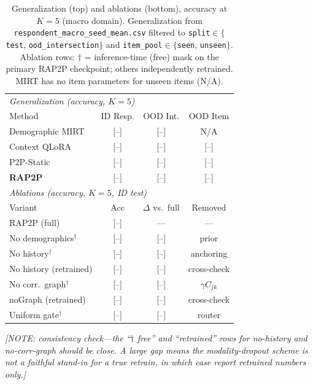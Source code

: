 \documentclass[letterpaper]{article} %
\begin{document}
\begin{table}[t]
\centering
\caption{Generalization (top) and ablations (bottom), accuracy at $K{=}5$
(macro domain). Generalization from \texttt{respondent\_macro\_seed\_mean.csv}
filtered to \texttt{split}$\in\{$\texttt{test}, \texttt{ood\_intersection}$\}$
and \texttt{item\_pool}$\in\{$\texttt{seen}, \texttt{unseen}$\}$. Ablation rows:
$\dagger$ = inference-time (free) mask on the primary RAP2P checkpoint; others
independently retrained. MIRT has no item parameters for unseen items (N/A).}
\label{tab:gen}
\setlength{\tabcolsep}{4pt}
\begin{tabular}{lccc}
\toprule
\multicolumn{4}{l}{\emph{Generalization (accuracy, $K{=}5$)}}\\
Method & ID Resp. & OOD Int. & OOD Item \\
\midrule
Demographic MIRT & [--] & [--] & N/A \\
Context QLoRA    & [--] & [--] & [--] \\
P2P-Static       & [--] & [--] & [--] \\
\textbf{RAP2P}   & [--] & [--] & [--] \\
\midrule
\multicolumn{4}{l}{\emph{Ablations (accuracy, $K{=}5$, ID test)}}\\
Variant & Acc & $\Delta$ vs.\ full & Removed \\
\midrule
RAP2P (full)             & [--] & ---  & --- \\
No demographics$^{\dagger}$ & [--] & [--] & prior \\
No history$^{\dagger}$      & [--] & [--] & anchoring \\
No history (retrained)   & [--] & [--] & cross-check \\
No corr.\ graph$^{\dagger}$ & [--] & [--] & $\gamma C_{jk}$ \\
noGraph (retrained)      & [--] & [--] & cross-check \\
Uniform gate$^{\dagger}$    & [--] & [--] & router \\
\bottomrule
\end{tabular}
\end{table}

\emph{[NOTE: consistency check---the ``$\dagger$ free'' and ``retrained'' rows
for no-history and no-corr-graph should be close. A large gap means the
modality-dropout scheme is not a faithful stand-in for a true retrain, in which
case report retrained numbers only.]}
\end{document}
